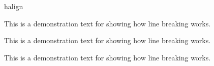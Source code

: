 \begin{docTcbKeys}[
    doc parameter   = {=\meta{alignment}},
    doc description = {无默认值，初始 \texttt{justify}},
    doc new         = 2015-05-07,
  ]
\begin{exdispExample}{halign}
\begin{tcolorbox}[adjusted title=center,halign=center]
This is a demonstration text for showing how line breaking works.
\end{tcolorbox}
\begin{tcolorbox}[adjusted title=left,halign=left]
This is a demonstration text for showing how line breaking works.
\end{tcolorbox}
\begin{tcolorbox}[adjusted title=right,halign upper=right]
This is a demonstration text for showing how line breaking works.
\end{tcolorbox}
\end{exdispExample}

\end{docTcbKeys}

\clearpage

